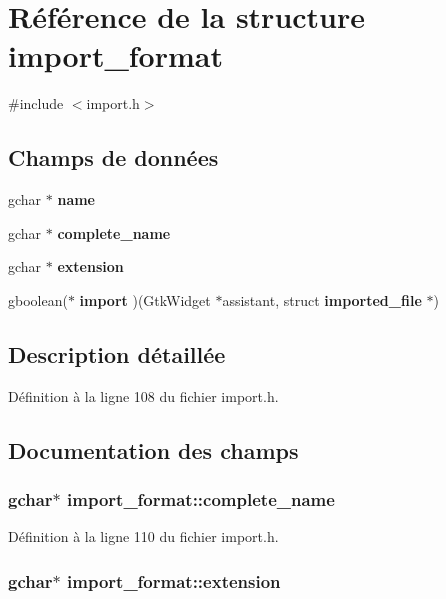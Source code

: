\section{Référence de la structure import\_\-format}
\label{structimport__format}


{\ttfamily \#include $<$import.h$>$}

\subsection*{Champs de données}
\begin{DoxyCompactItemize}
\item 
gchar $\ast$ {\bf name}
\item 
gchar $\ast$ {\bf complete\_\-name}
\item 
gchar $\ast$ {\bf extension}
\item 
gboolean($\ast$ {\bf import} )(GtkWidget $\ast$assistant, struct {\bf imported\_\-file} $\ast$)
\end{DoxyCompactItemize}


\subsection{Description détaillée}


Définition à la ligne 108 du fichier import.h.



\subsection{Documentation des champs}
\subsubsection[{complete\_\-name}]{\setlength{\rightskip}{0pt plus 5cm}gchar$\ast$ {\bf import\_\-format::complete\_\-name}}\label{structimport__format_ad56aa46c179fd48f77dfdd535aa2e734}


Définition à la ligne 110 du fichier import.h.

\subsubsection[{extension}]{\setlength{\rightskip}{0pt plus 5cm}gchar$\ast$ {\bf import\_\-format::extension}}\label{structimport__format_a218d1ed91e7f487691b69458206c1b52}


